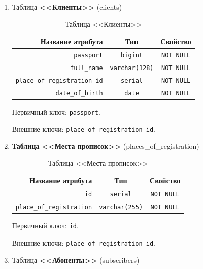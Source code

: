 \begin{enumerate}
    \item Таблица \textbf{<<Клиенты>>} (clients)
    
    \renewcommand{\arraystretch}{1.5}
    \begin{xltabular}[h]{\textwidth}{|R|C|C|}
        \caption{Таблица <<Клиенты>>} \\
        \hline
        \textbf{Название атрибута}           & \textbf{Тип}          & \textbf{Свойство} \\
        \hline \endhead
        \texttt{passport}                    & \texttt{bigint}       & \texttt{NOT NULL} \\
        \hline
        \texttt{full\_name}                  & \texttt{varchar(128)} & \texttt{NOT NULL} \\
        \hline
        \texttt{place\_of\_registration\_id} & \texttt{serial}       & \texttt{NOT NULL} \\
        \hline
        \texttt{date\_of\_birth}             & \texttt{date}         & \texttt{NOT NULL} \\
        \hline
    \end{xltabular}

    \tab Первичный ключ: \texttt{passport}.

    \tab Внешние ключи: \texttt{place\_of\_registration\_id}.
    

    \item \textbf{Таблица <<Места прописок>>} (places\_of\_registration)
    
    \renewcommand{\arraystretch}{1.5}
    \begin{xltabular}[h]{\textwidth}{|R|C|C|}
        \caption{Таблица <<Места прописок>>} \\
        \hline
        \textbf{Название атрибута}       & \textbf{Тип}          & \textbf{Свойство} \\
        \hline \endhead
        \texttt{id}                      & \texttt{serial}       & \texttt{NOT NULL} \\
        \hline
        \texttt{place\_of\_registration} & \texttt{varchar(255)} & \texttt{NOT NULL} \\
        \hline
    \end{xltabular}

    \tab Первичный ключ: \texttt{id}.

    \tab Внешние ключи: \texttt{place\_of\_registration\_id}.
    

    \item Таблица \textbf{<<Абоненты>>} (subscribers)
    

\end{enumerate}
